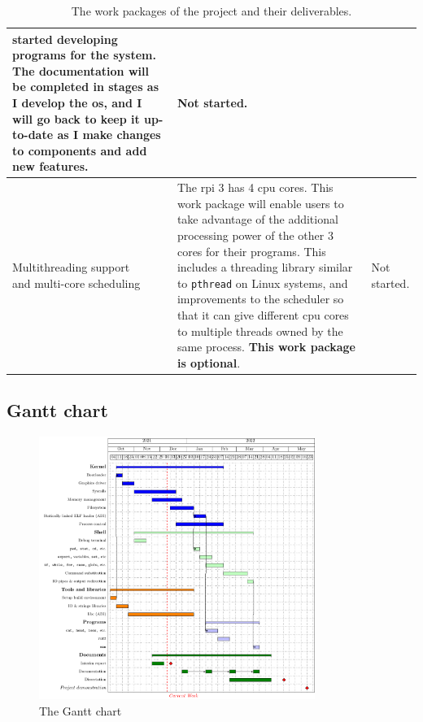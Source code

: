 \documentclass{article}
\begin{document}
\begin{table}[tbp]
\begin{center}
\begin{tabularx}{\textwidth}{|p{}|X|p{}|}
    started developing programs for the system. The documentation will be
    completed in stages as I develop the \gls{os}, and I will go back
    to keep it up-to-date as I make changes to components and add new
    features. &
    Not started.
    \\ \hline
    \makecell[lt]{Multithreading support \\ and multi-core scheduling} &
    The \gls{rpi} 3 has 4 \gls{cpu} cores. This work package will enable users
    to take advantage of the additional processing power of the other 3 cores
    for their programs. This includes a threading library similar to
    \texttt{pthread} on Linux systems, and improvements to the scheduler so
    that it can give different \gls{cpu} cores to multiple threads owned by the
    same process. \textbf{This work package is optional}. &
    Not started.
    \\ \hline
\end{tabularx}
\caption{The work packages of the project and their deliverables.}
\label{tab:interim_work_packages}
\end{center}
\end{table}

\subsection{Gantt chart}

\begin{figure}[H]
    \centering
    \includegraphics[width=0.8\textwidth]{build/interim-gantt.pdf}
    \caption{The Gantt chart}
    \label{fig:interim_gantt}
\end{figure}
\end{document}
